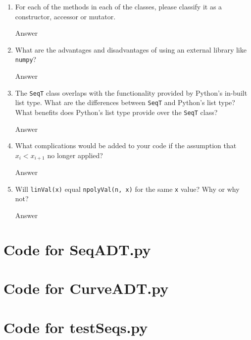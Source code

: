 \documentclass[12pt]{article}
\begin{document}
\begin{enumerate}

\item For each of the methods in each of the classes, please classify it as a
  constructor, accessor or mutator.

Answer

\item What are the advantages and disadvantages of using an external library
  like \texttt{numpy}?

Answer

\item The \texttt{SeqT} class overlaps with the functionality provided by
  Python's in-built list type.  What are the differences between \texttt{SeqT}
  and Python's list type?  What benefits does Python's list type provide over
  the \texttt{SeqT} class?

Answer

\item What complications would be added to your code if the assumption that
  $x_i < x_{i+1}$ no longer applied?

Answer

\item Will \texttt{linVal(x)} equal \texttt{npolyVal(n, x)} for the same \texttt{x}
  value?  Why or why not?

Answer
\end{enumerate}

\newpage

\lstset{language=Python, basicstyle=\tiny, breaklines=true, showspaces=false,
  showstringspaces=false, breakatwhitespace=true}

\def\thesection{\Alph{section}} 

\section{Code for SeqADT.py}

\noindent 

\newpage

\section{Code for CurveADT.py}

\noindent 

\newpage

\section{Code for testSeqs.py}
\end{document}
